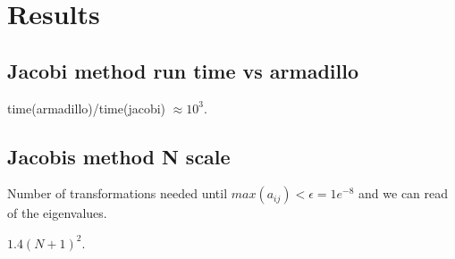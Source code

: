 \section{Results}


\subsection{Jacobi method run time vs armadillo}

time(armadillo)/time(jacobi) $\approx 10^{3}$.

\subsection{Jacobis method N scale}

Number of transformations needed until $max(a_{ij}) < \epsilon = 1e^{-8}$ and we
can read of the eigenvalues.

$1.4 (N+1)^2$.
